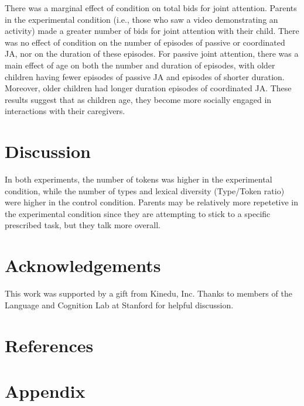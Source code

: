 \documentclass[]{article}
\begin{document}
There was a marginal effect of condition on total bids for joint
attention. Parents in the experimental condition (i.e., those who saw a
video demonstrating an activity) made a greater number of bids for joint
attention with their child. There was no effect of condition on the
number of episodes of passive or coordinated JA, nor on the duration of
these episodes. For passive joint attention, there was a main effect of
age on both the number and duration of episodes, with older children
having fewer episodes of passive JA and episodes of shorter duration.
Moreover, older children had longer duration episodes of coordinated JA.
These results suggest that as children age, they become more socially
engaged in interactions with their caregivers.

\hypertarget{discussion-1}{%
\section{Discussion}\label{discussion-1}}

In both experiments, the number of tokens was higher in the experimental
condition, while the number of types and lexical diversity (Type/Token
ratio) were higher in the control condition. Parents may be relatively
more repetetive in the experimental condition since they are attempting
to stick to a specific prescribed task, but they talk more overall.

\hypertarget{acknowledgements}{%
\section{Acknowledgements}\label{acknowledgements}}

This work was supported by a gift from Kinedu, Inc. Thanks to members of
the Language and Cognition Lab at Stanford for helpful discussion.

\hypertarget{references}{%
\section{References}\label{references}}

\setlength{\parindent}{-0.1in} 
\setlength{\leftskip}{0.125in}

\noindent

\hypertarget{appendix}{%
\section{Appendix}\label{appendix}}
\end{document}
